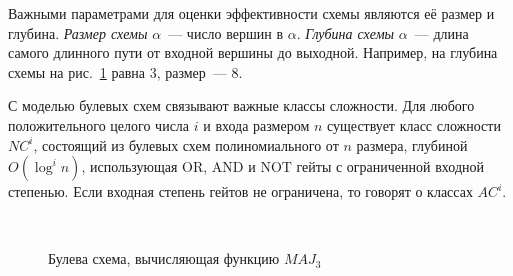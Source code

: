 Важными параметрами для оценки эффективности схемы являются её размер и глубина.
\textit{Размер схемы} $\alpha$~--- число вершин в $\alpha$. \textit{Глубина схемы} $\alpha$~--- длина самого длинного пути от входной вершины до выходной.
Например, на глубина схемы на рис.~\ref{circuit} равна 3, размер~--- 8.

С моделью булевых схем связывают важные классы сложности. Для любого положительного целого числа $i$ и входа размером $n$ существует класс сложности $NC^i$, состоящий из булевых схем полиномиального от $n$ размера, глубиной $O(\log^i n)$, использующая OR, AND и NOT гейты с ограниченной входной степенью. Если входная степень гейтов не ограничена, то говорят о классах $AC^i$.
\begin{figure}

\centering
{}
 \\

	\caption{Булева схема, вычисляющая функцию $MAJ_3$}
\label{circuit}
\end{figure}


